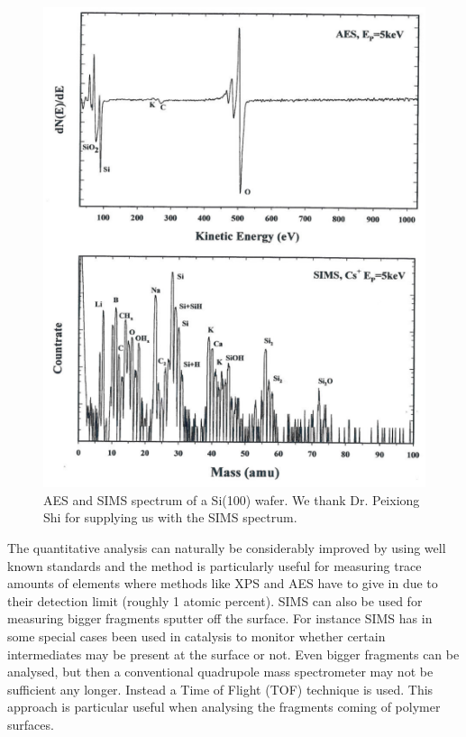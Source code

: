 \begin{figure}[h!]
	\begin{center}
	\includegraphics[scale=4]{figures/11_07.png}
	\caption{AES and SIMS spectrum of a Si(100) wafer. We thank Dr. Peixiong Shi for supplying us with the SIMS spectrum.}
	\label{fig:siaessims}
	\end{center}
\end{figure}

The quantitative analysis can naturally be considerably improved by using well known standards and the method is particularly useful for measuring trace amounts of elements where methods like XPS and AES have to give in due to their detection limit (roughly 1 atomic percent). SIMS can also be used for measuring bigger fragments sputter off the surface. For instance SIMS has in some special cases been used in catalysis to monitor whether certain intermediates may be present at the surface or not. Even bigger fragments can be analysed, but then a conventional quadrupole mass spectrometer may not be sufficient any longer. Instead a Time of Flight  (TOF) technique is used. This approach is particular useful when analysing the fragments coming of polymer surfaces.

